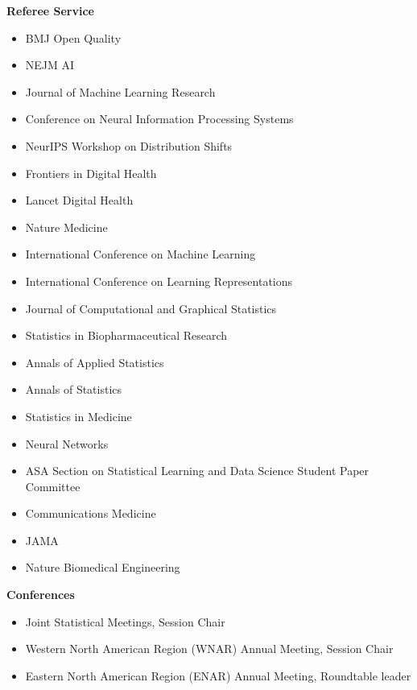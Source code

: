 \documentclass[11pt,a4paper,sans]{moderncv}        %
\begin{document}
\textbf{Referee Service}
\begin{itemize}
	\item BMJ Open Quality  %
	\item NEJM AI %
	\item Journal of Machine Learning Research %
	\item Conference on Neural Information Processing Systems %
	\item NeurIPS Workshop on Distribution Shifts %
	\item Frontiers in Digital Health %
	\item Lancet Digital Health %
	\item Nature Medicine %
        \item International Conference on Machine Learning %
        \item International Conference on Learning Representations %
	\item Journal of Computational and Graphical Statistics %
	\item Statistics in Biopharmaceutical Research %
	\item Annals of Applied Statistics %
	\item Annals of Statistics %
	\item Statistics in Medicine %
	\item Neural Networks %
	\item ASA Section on Statistical Learning and Data Science Student Paper Committee %
	\item Communications Medicine %
	\item JAMA
        \item Nature Biomedical Engineering %
\end{itemize}

\textbf{Conferences}
\begin{itemize}
\item Joint Statistical Meetings, Session Chair
\item Western North American Region (WNAR) Annual Meeting, Session Chair
\item Eastern North American Region (ENAR) Annual Meeting, Roundtable leader
\end{itemize}
\end{document}
